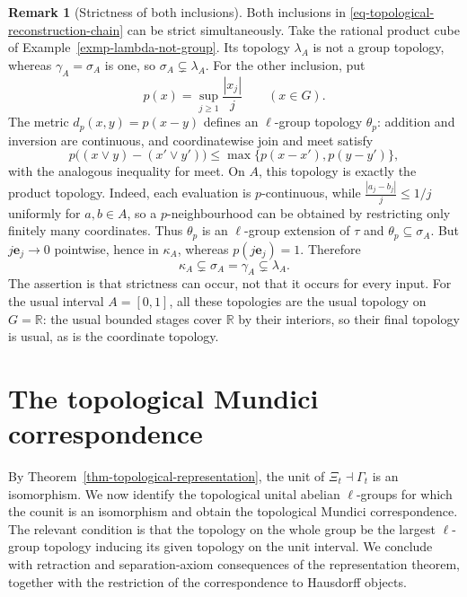 \documentclass[preprint,3p]{elsarticle}
\theoremstyle{plain}
\theoremstyle{definition}
\newtheorem{rem}[thm]{Remark}
\numberwithin{equation}{section}
\begin{document}
\begin{rem}[Strictness of both inclusions]
\label{rem-reconstruction-strictness}
Both inclusions in \eqref{eq-topological-reconstruction-chain} can
be strict simultaneously.  Take the rational product cube of
Example~\ref{exmp-lambda-not-group}.  Its topology $\lambda_A$ is
not a group topology, whereas $\gamma_A=\sigma_A$ is one, so
$\sigma_A\subsetneq\lambda_A$.
For the other inclusion, put
\[
 p(x)=\sup_{j\geq1}\frac{|x_j|}{j}\qquad(x\in G).
\]
The metric $d_p(x,y)=p(x-y)$ defines an $\ell$-group topology
$\theta_p$: addition and inversion are continuous, and coordinatewise
join and meet satisfy
\[
 p\bigl((x\vee y)-(x'\vee y')\bigr)
 \leq\max\{p(x-x'),p(y-y')\},
\]
with the analogous inequality for meet.
On $A$, this topology is exactly the product topology.
Indeed, each evaluation is $p$-continuous, while
$\frac{|a_j-b_j|}{j}\leq1/j$ uniformly for $a,b\in A$, so a $p$-neighbourhood
can be obtained by restricting only finitely many coordinates.
Thus $\theta_p$ is an $\ell$-group extension of $\tau$ and
$\theta_p\subseteq\sigma_A$.
But $j\mathbf e_j\to0$ pointwise, hence in $\kappa_A$, whereas
$p(j\mathbf e_j)=1$.  Therefore
\begin{equation}
\label{eq-topological-chain-simultaneously-strict}
 \kappa_A\subsetneq\sigma_A=\gamma_A\subsetneq\lambda_A.
\end{equation}
The assertion is that strictness can occur, not that it occurs for
every input.  For the usual interval $A=[0,1]$, all these topologies
are the usual topology on $G=\mathbb R$: the usual bounded stages
cover $\mathbb R$ by their interiors, so their final topology is
usual, as is the coordinate topology.
\end{rem}


\section{The topological Mundici correspondence}
\label{sec-correspondence}

By Theorem~\ref{thm-topological-representation}, the unit of
$\Xi_t\dashv\Gamma_t$ is an isomorphism.  We now identify the
topological unital abelian $\ell$-groups for which the counit is
an isomorphism and obtain the topological Mundici correspondence.
The relevant condition is that the topology on the whole
group be the largest $\ell$-group topology inducing its given topology
on the unit interval.  
We conclude with retraction and separation-axiom consequences
of the representation theorem, together with the restriction
of the correspondence to Hausdorff objects.
\end{document}
